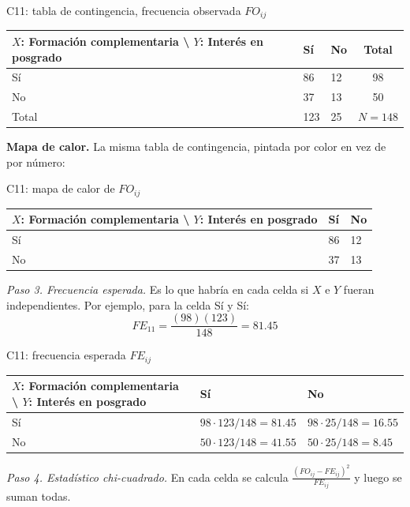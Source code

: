 \begin{mitabla}{C11: tabla de contingencia, frecuencia observada $FO_{ij}$}
\begin{tabular}{L{3.8cm}C{3.00cm}C{3.00cm}|c}
\toprule
$X$: Formación complementaria \textbackslash{} $Y$: Interés en posgrado & Sí & No & Total \\
\midrule
Sí & 86 & 12 & 98 \\
No & 37 & 13 & 50 \\
\midrule
Total & 123 & 25 & $N = 148$ \\
\bottomrule
\end{tabular}
\end{mitabla}

\textbf{Mapa de calor.} La misma tabla de contingencia, pintada por color en vez de por número:

\begin{mitabla}{C11: mapa de calor de $FO_{ij}$}
\begin{tabular}{L{3.8cm}C{3.00cm}C{3.00cm}}
\toprule
$X$: Formación complementaria \textbackslash{} $Y$: Interés en posgrado & Sí & No \\
\midrule
Sí & 86 & 12 \\
No & 37 & 13 \\
\bottomrule
\end{tabular}
\end{mitabla}

\textit{Paso 3. Frecuencia esperada.} Es lo que habría en cada celda si $X$ e $Y$ fueran independientes. Por ejemplo, para la celda Sí y Sí:
\[
FE_{11} = \frac{(98)(123)}{148} = 81.45
\]

\begin{mitabla}{C11: frecuencia esperada $FE_{ij}$}
\begin{tabular}{L{3.8cm}C{3.00cm}C{3.00cm}}
\toprule
$X$: Formación complementaria \textbackslash{} $Y$: Interés en posgrado & Sí & No \\
\midrule
Sí & $98\cdot123/148 = 81.45$ & $98\cdot25/148 = 16.55$ \\
No & $50\cdot123/148 = 41.55$ & $50\cdot25/148 = 8.45$ \\
\bottomrule
\end{tabular}
\end{mitabla}

\textit{Paso 4. Estadístico chi-cuadrado.} En cada celda se calcula $\frac{(FO_{ij}-FE_{ij})^2}{FE_{ij}}$ y luego se suman todas.

